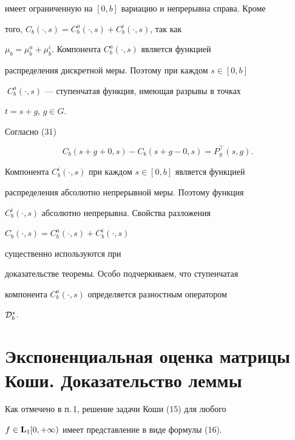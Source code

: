 имеет ограниченную на $[0,b]$ вариацию и непрерывна справа. Кроме


того, $C_b(\cdot,s)=C_b^a(\cdot,s)+C_b^i(\cdot,s)$, так как


$\mu_b=\mu_b^a+\mu_b^i$. Компонента $C_b^a(\cdot,s)$ является функцией


распределения дискретной меры. Поэтому при каждом $s\in[0,b]\;$


$\;C_b^a(\cdot,s)$ --- ступенчатая функция, имеющая разрывы в точках


$t=s+g$, $g\in G$.





Согласно (31)


%


\begin{equation}


C_b(s+g+0,s)-C_b(s+g-0,s)=P_g^\top (s,g).


\end{equation}


%





Компонента $C_b^i(\cdot,s)$ при каждом $s\in[0,b]$ является функцией


распределения абсолютно непрерывной меры. Поэтому функция


$C_b^i(\cdot,s)$ абсолютно непрерывна. Свойства разложения 


$C_b(\cdot,s)=C_b^a(\cdot,s)+C_b^i(\cdot,s)$


существенно используются при


доказательстве теоремы. Особо подчеркиваем, что ступенчатая


компонента $C_b^a(\cdot,s)$ определяется разностным оператором


${\cal D}_b^*$.





\section{Экспоненциальная оценка матрицы Коши. Доказательство леммы}





Как отмечено в п.\,1, решение задачи Коши (15) для любого


$f\in\bold L_1[0,+\infty)$ имеет представление в виде формулы (16).





